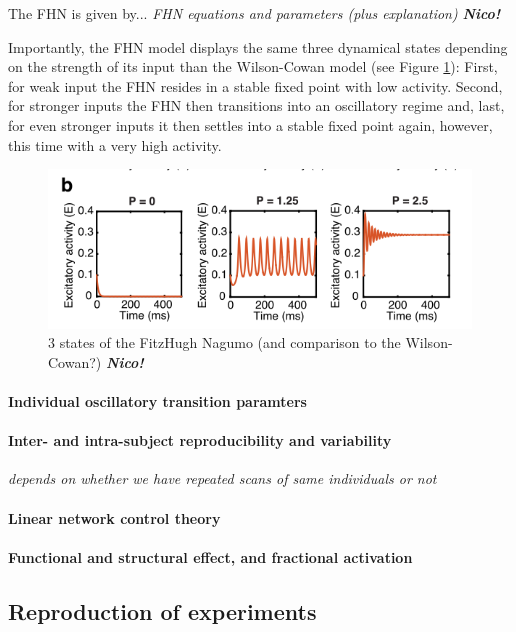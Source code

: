 The FHN is given by...\textit{  FHN equations and parameters (plus explanation)} \textbf{\textit{Nico!}}


Importantly, the FHN model displays the same three dynamical states depending on the strength of its input than the Wilson-Cowan model (see Figure \ref{fig:FHN}): 
First, for weak input the FHN resides in a stable fixed point with low activity. Second, for stronger inputs the FHN then transitions into an oscillatory
regime and, last, for even stronger inputs it then settles into a stable fixed point again, however, this time with a very high activity.

\begin{figure}
\includegraphics{Figures/placeholder}
 \caption{ 3 states of the FitzHugh Nagumo (and comparison to the Wilson-Cowan?) \textbf{\textit{Nico!}}}
 \label{fig:FHN}
\end{figure}


\paragraph{Individual oscillatory transition paramters}


\paragraph{Inter- and intra-subject reproducibility and variability}
\textit{depends on whether we have repeated scans of same individuals or not}


\paragraph{Linear network control theory}


\paragraph{Functional and structural effect, and fractional activation}


\subsection{Reproduction of experiments}

